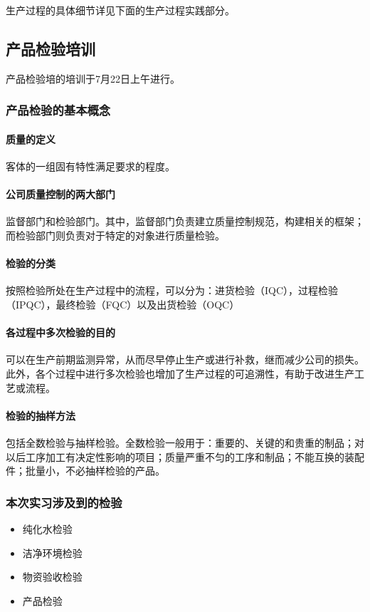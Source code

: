 生产过程的具体细节详见下面的生产过程实践部分。

\subsection{产品检验培训}
产品检验培的培训于7月22日上午进行。

\subsubsection{产品检验的基本概念}

\paragraph{质量的定义} 客体的一组固有特性满足要求的程度。

\paragraph{公司质量控制的两大部门} 监督部门和检验部门。其中，监督部门负责建立质量控制规范，构建相关的框架；而检验部门则负责对于特定的对象进行质量检验。

\paragraph{检验的分类} 按照检验所处在生产过程中的流程，可以分为：进货检验（IQC），过程检验（IPQC），最终检验（FQC）以及出货检验（OQC）

\paragraph{各过程中多次检验的目的} 可以在生产前期监测异常，从而尽早停止生产或进行补救，继而减少公司的损失。此外，各个过程中进行多次检验也增加了生产过程的可追溯性，有助于改进生产工艺或流程。

\paragraph{检验的抽样方法} 包括全数检验与抽样检验。全数检验一般用于：重要的、关键的和贵重的制品；对以后工序加工有决定性影响的项目；质量严重不匀的工序和制品；不能互换的装配件；批量小，不必抽样检验的产品。

\subsubsection{本次实习涉及到的检验}
\begin{itemize}
    \item 纯化水检验
    \item 洁净环境检验
    \item 物资验收检验
    \item 产品检验
\end{itemize}

